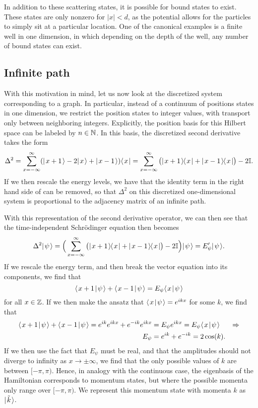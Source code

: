 \documentclass[../thesis-main/thesis-main]{subfiles}
\begin{document}
In addition to these scattering states, it is possible for bound states to exist.  These states are only nonzero for $|x| <d$, as the potential allows for the particles to simply sit at a particular location. One of the canonical examples is a finite well in one dimension, in which depending on the depth of the well, any number of bound states can exist.


\subsection{Infinite path}

With this motivation in mind, let us now look at the discretized system corresponding to a graph.  In particular, instead of a continuum of positions states in one dimension, we restrict the position states to integer values, with transport only between neighboring integers.  Explicitly, the position basis for this Hilbert space can be labeled by $n\in \mathbb{N}$.  In this basis, the discretized second derivative takes the form
\begin{equation}
\label{eq:discrete_second_derivative}
  \Delta^2 = \sum_{x=-\infty}^\infty (|\mspace{2mu} x + 1 \mspace{2mu} \rangle - 2|\mspace{2mu} x \mspace{2mu} \rangle + |\mspace{2mu} x-1 \mspace{2mu} \rangle) \langle\mspace{2mu} x \mspace{2mu} | = \sum_{x=-\infty}^\infty \big(|\mspace{2mu} x+1 \mspace{2mu} \rangle\mspace{-2mu}\langle\mspace{2mu} x \mspace{2mu} | + |\mspace{2mu} x-1 \mspace{2mu} \rangle\mspace{-2mu}\langle\mspace{2mu} x \mspace{2mu} |\big) - 2 \mathbb{I}.
\end{equation}
If we then rescale the energy levels, we have that the identity term in the right hand side of  can be removed, so that $\Delta^2$ on this discretized one-dimensional system is proportional to the adjacency matrix of an infinite path.  

With this representation of the second derivative operator, we can then see that the time-independent Schr\"{o}dinger equation then becomes
\begin{equation}
  \Delta^2 |\mspace{2mu} \psi \mspace{2mu} \rangle = \Big(\sum_{x=-\infty}^\infty \big(|\mspace{2mu} x+1 \mspace{2mu} \rangle\mspace{-2mu}\langle\mspace{2mu} x \mspace{2mu} | + |\mspace{2mu} x-1 \mspace{2mu} \rangle\mspace{-2mu}\langle\mspace{2mu} x \mspace{2mu} |\big) - 2 \mathbb{I}\Big) |\mspace{2mu} \psi \mspace{2mu} \rangle = E'_{\psi} |\mspace{2mu} \psi \mspace{2mu} \rangle.
\end{equation}
If we rescale the energy term, and then break the vector equation into its components, we find that
\begin{equation}
  \langle\mspace{2mu} x+1 \mspace{2mu} | \mspace{2mu} \psi\mspace{2mu} \rangle + \langle\mspace{2mu} x-1 \mspace{2mu} | \mspace{2mu} \psi\mspace{2mu} \rangle = E_\psi \langle\mspace{2mu} x \mspace{2mu} | \mspace{2mu} \psi\mspace{2mu} \rangle
\end{equation}
for all $x\in \mathbb{Z}$.  If we then make the ansatz that $\langle\mspace{2mu} x \mspace{2mu} | \mspace{2mu} \psi\mspace{2mu} \rangle = e^{i k x}$ for some $k$, we find that
\begin{align}
  \langle\mspace{2mu} x+1 \mspace{2mu} | \mspace{2mu} \psi\mspace{2mu} \rangle + \langle\mspace{2mu} x-1 \mspace{2mu} | \mspace{2mu} \psi\mspace{2mu} \rangle = e^{i k } e^{i k x} + e^{-ik} e^{ikx} &= E_\psi e^{ik x} = E_\psi \langle\mspace{2mu} x \mspace{2mu} | \mspace{2mu} \psi\mspace{2mu} \rangle &\Rightarrow \\ E_\psi &= e^{ik} + e^{-i k} = 2 \cos(k).
\end{align}
If we then use the fact that $E_\psi$ must be real, and that the amplitudes should not diverge to infinity as $x\rightarrow \pm \infty$, we find that the only possible values of $k$ are between $[-\pi,\pi)$.    Hence, in analogy with the continuous case, the eigenbasis of the Hamiltonian corresponds to momentum states, but where the possible momenta only range over $[-\pi,\pi)$.  We represent this momentum state with momenta $k$ as $|\mspace{2mu} \tilde{k} \mspace{2mu} \rangle$.
\end{document}

